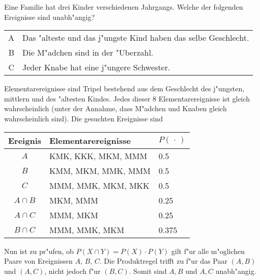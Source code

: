 Eine Familie hat drei Kinder verschiedenen Jahrgangs. Welche der
folgenden Ereignisse sind unabh"angig?

\begin{tabular}{rl}
A & Das "alteste und das j"ungste Kind haben das selbe Geschlecht.\\
B & Die M"adchen sind in der "Uberzahl.\\
C & Jeder Knabe hat eine j"ungere Schwester.
\end{tabular}

\begin{loesung}
Elementarereignisse sind Tripel bestehend aus dem Geschlecht
des j"ungsten, mittlern und des "altesten Kindes.
Jedes dieser 8 Elementarereignisse ist gleich wahrscheinlich (unter
der Annahme, dass M"adchen und Knaben gleich wahrscheinlich sind). Die
gesuchten Ereignisse sind
\begin{center}
\begin{tabular}{|c|l|l|}
\hline
Ereignis&Elementarereignisse&$P(\,\cdot\,)$\\
\hline
$A$&KMK, KKK, MKM, MMM&0.5\\
$B$&KMM, MKM, MMK, MMM&0.5\\
$C$&MMM, MMK, MKM, MKK&0.5\\
\hline
$A\cap B$&MKM, MMM&0.25\\
$A\cap C$&MMM, MKM&0.25\\
$B\cap C$&MMM, MMK, MKM&0.375\\
\hline
\end{tabular}
\end{center}
Nun ist zu pr"ufen, ob $P(X\cap Y)=P(X)\cdot P(Y)$ gilt f"ur alle
m"oglichen Paare von Ereignissen $A$, $B$, $C$.
Die Produktregel trifft zu f"ur
das Paar $(A,B)$ und $(A,C)$, nicht jedoch f"ur $(B,C)$.
Somit sind $A,B$ und $A,C$ unabh"angig.
\end{loesung}

